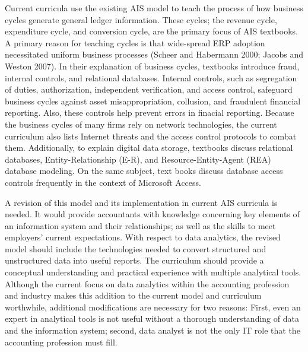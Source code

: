 \documentclass[12pt]{article}
\begin{document}
Current curricula use the existing AIS model to teach the process of how business cycles generate general ledger information. These cycles; the revenue cycle, expenditure cycle, and conversion cycle, are the primary focus of AIS textbooks. A primary reason for teaching cycles is that wide-spread ERP adoption necessitated uniform business processes (Scheer and Habermann 2000; Jacobs and Weston 2007). In their explanation of business cycles, textbooks introduce fraud, internal controls, and relational databases. Internal controls, such as segregation of duties, authorization, independent verification, and access control, safeguard business cycles against asset misappropriation, collusion, and fraudulent financial reporting. Also, these controls help prevent errors in finacial reporting. Because the business cycles of many firms rely on network technologies, the current curriculum also lists Internet threats and the access control protocols to combat them. Additionally, to explain digital data storage, textbooks discuss relational databases, Entity-Relationship (E-R), and Resource-Entity-Agent (REA) database modeling. On the same subject, text books discuss database access controls frequently in the context of Microsoft Access.

A revision of this model and its implementation in current AIS curricula is needed. It would provide accountants with knowledge concerning key elements of an information system and their relationships; as well as the skills to meet employers' current expectations. With respect to data analytics, the revised model should include the technologies needed to convert structured and unstructured data into useful reports. The curriculum should provide a conceptual understanding and practical experience with multiple analytical tools. Although the current focus on data analytics within the accounting profession and industry makes this addition to the current model and curriculum worthwhile, additional modifications are necessary for two reasons: First, even an expert in analytical tools is not useful without a thorough understanding of data and the information system; second, data analyst is not the only IT role that the accounting profession must fill.
\end{document}
